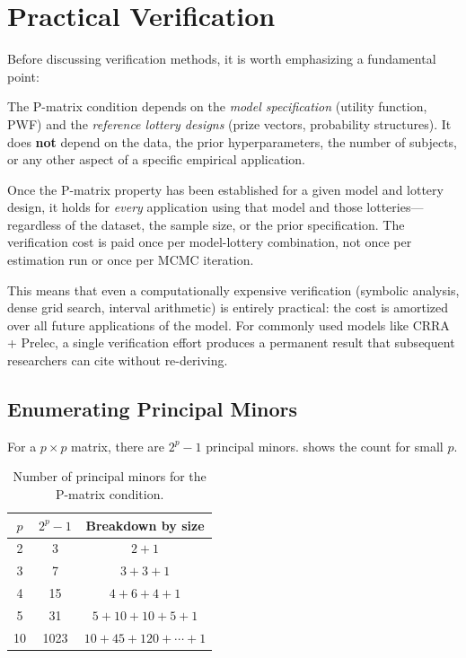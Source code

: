 \documentclass[11pt,a4paper]{article}
\theoremstyle{definition}
\begin{document}
\section{Practical Verification}
\label{sec:verification}

Before discussing verification methods, it is worth emphasizing a fundamental
point:

\begin{keyresult}
The P-matrix condition depends on the \emph{model specification} (utility
function, PWF) and the \emph{reference lottery designs} (prize vectors,
probability structures). It does \textbf{not} depend on the data, the prior
hyperparameters, the number of subjects, or any other aspect of a specific
empirical application.

Once the P-matrix property has been established for a given model and lottery
design, it holds for \emph{every} application using that model and those
lotteries---regardless of the dataset, the sample size, or the prior
specification. The verification cost is paid once per model-lottery
combination, not once per estimation run or once per MCMC iteration.
\end{keyresult}

This means that even a computationally expensive verification (symbolic
analysis, dense grid search, interval arithmetic) is entirely practical: the
cost is amortized over all future applications of the model. For commonly
used models like CRRA + Prelec, a single verification effort produces a
permanent result that subsequent researchers can cite without re-deriving.

\subsection{Enumerating Principal Minors}

For a $p \times p$ matrix, there are $2^p - 1$ principal minors.
 shows the count for small $p$.

\begin{table}[ht]
\centering
\begin{tabular}{ccc}
    $p$ & $2^p - 1$ & Breakdown by size \\
    \hline
    2 & 3 & $2 + 1$ \\
    3 & 7 & $3 + 3 + 1$ \\
    4 & 15 & $4 + 6 + 4 + 1$ \\
    5 & 31 & $5 + 10 + 10 + 5 + 1$ \\
    10 & 1023 & $10 + 45 + 120 + \cdots + 1$
\end{tabular}
\caption{Number of principal minors for the P-matrix condition.}
\label{tab:minor_count}
\end{table}
\end{document}
